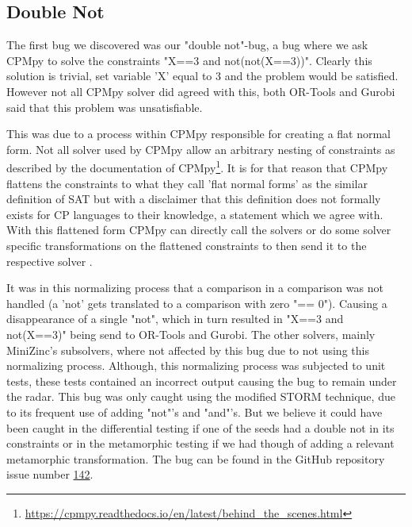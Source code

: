 \subsection{Double Not}
\label{res:bug:DoubleNot}
The first bug we discovered was our "double not"-bug, a bug where we ask CPMpy to solve the constraints "X==3 and not(not(X==3))". Clearly this solution is trivial, set variable 'X' equal to 3 and the problem would be satisfied. However not all CPMpy solver did agreed with this, both OR-Tools and Gurobi said that this problem was unsatisfiable. 

This was due to a process within CPMpy responsible for creating a flat normal form. Not all solver used by CPMpy allow an arbitrary nesting of constraints as described by the documentation of CPMpy\footnote{\url{https://cpmpy.readthedocs.io/en/latest/behind_the_scenes.html}}. It is for that reason that CPMpy flattens the constraints to what they call 'flat normal forms' as the similar definition of SAT but with a disclaimer that this definition does not formally exists for CP languages to their knowledge, a statement which we agree with. With this flattened form CPMpy can directly call the solvers or do some solver specific transformations on the flattened constraints to then send it to the respective solver \cite{CPMpyGithub}. 

It was in this normalizing process that a comparison in a comparison was not handled (a 'not' gets translated to a comparison with zero "== 0"). Causing a disappearance of a single "not", which in turn resulted in "X==3 and not(X==3)" being send to OR-Tools and Gurobi. The other solvers, mainly MiniZinc's subsolvers, where not affected by this bug due to not using this normalizing process. Although, this normalizing process was subjected to unit tests, these tests contained an incorrect output causing the bug to remain under the radar. This bug was only caught using the modified STORM technique, due to its frequent use of adding "not"'s and "and"'s. But we believe it could have been caught in the differential testing if one of the seeds had a double not in its constraints or in the metamorphic testing if we had though of adding a relevant metamorphic transformation. The bug can be found in the GitHub repository issue number \href{https://github.com/CPMpy/cpmpy/issues/142}{142}.

